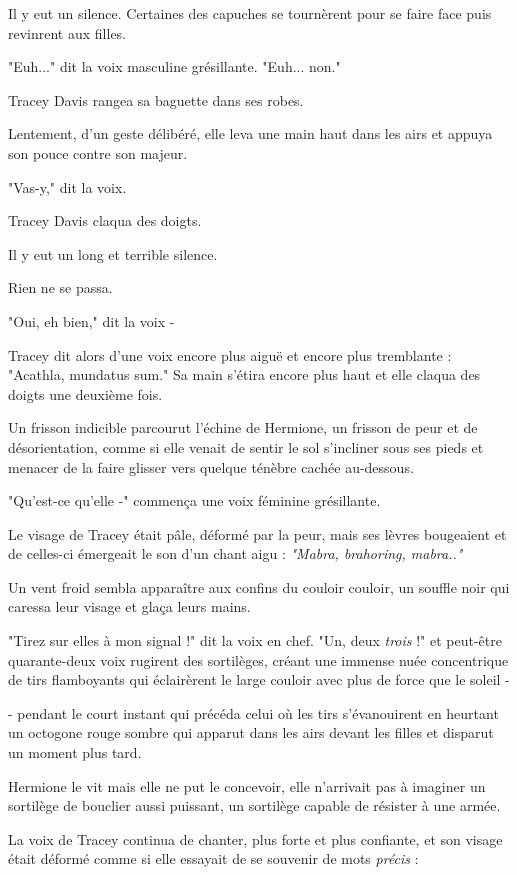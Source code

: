 Il y eut un silence. Certaines des capuches se tournèrent pour se faire face puis revinrent aux filles.

"Euh..." dit la voix masculine grésillante. "Euh... non."

Tracey Davis rangea sa baguette dans ses robes.

Lentement, d'un geste délibéré, elle leva une main haut dans les airs et appuya son pouce contre son majeur.

"Vas-y," dit la voix.

Tracey Davis claqua des doigts.

Il y eut un long et terrible silence.

Rien ne se passa.

"Oui, eh bien," dit la voix -

Tracey dit alors d'une voix encore plus aiguë et encore plus tremblante : "Acathla, mundatus sum." Sa main s'étira encore plus haut et elle claqua des doigts une deuxième fois.

Un frisson indicible parcourut l'échine de Hermione, un frisson de peur et de désorientation, comme si elle venait de sentir le sol s'incliner sous ses pieds et menacer de la faire glisser vers quelque ténèbre cachée au-dessous.

"Qu'est-ce qu'elle -" commença une voix féminine grésillante.

Le visage de Tracey était pâle, déformé par la peur, mais ses lèvres bougeaient et de celles-ci émergeait le son d'un chant aigu : \emph{"Mabra, brahoring, mabra.."} 

Un vent froid sembla apparaître aux confins du couloir couloir, un souffle noir qui caressa leur visage et glaça leurs mains.

"Tirez sur elles à mon signal !" dit la voix en chef. "Un, deux \emph{trois}  !" et peut-être quarante-deux voix rugirent des sortilèges, créant une immense nuée concentrique de tirs flamboyants qui éclairèrent le large couloir avec plus de force que le soleil -

- pendant le court instant qui précéda celui où les tirs s'évanouirent en heurtant un octogone rouge sombre qui apparut dans les airs devant les filles et disparut un moment plus tard.

Hermione le vit mais elle ne put le concevoir, elle n'arrivait pas à imaginer un sortilège de bouclier aussi puissant, un sortilège capable de résister à une armée.

La voix de Tracey continua de chanter, plus forte et plus confiante, et son visage était déformé comme si elle essayait de se souvenir de mots \emph{précis}  :

